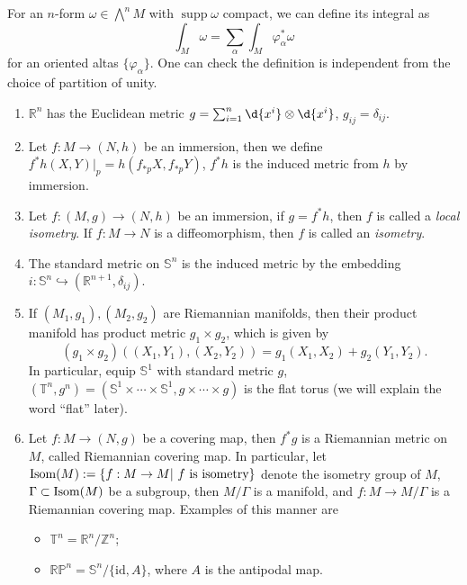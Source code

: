 \begin{rem}
    For an $n$-form $\omega\in\bigwedge^nM$ with $\operatorname{supp}\omega$ compact, we can define its integral as
    \[\int_M\omega=\sum_\alpha\int_M\varphi_\alpha^*\omega\]
    for an oriented altas $\{\varphi_\alpha\}$.
    One can check the definition is independent from the choice of partition of unity.
\end{rem}

\begin{eg}
    \begin{enumerate}[(1)]
        \item $\mathbb{R}^n$ has the Euclidean metric $g=\sum_{i=1}^n\d{x^i}\otimes\d{x^i}$, $g_{ij}=\delta_{ij}$.
        \item Let $f:M\to(N,h)$ be an immersion, then we define $f^*h(X,Y)|_p=h(f_{*p}X,f_{*p}Y)$, $f^*h$ is the induced metric from $h$ by immersion.
        \item Let $f:(M,g)\to(N,h)$ be an immersion, if $g=f^*h$, then $f$ is called a \emph{local isometry}.
        If $f:M\to N$ is a diffeomorphism, then $f$ is called an \emph{isometry}.
        \item The standard metric on $\mathbb{S}^n$ is the induced metric by the embedding $i:\mathbb{S}^n\hookrightarrow(\mathbb{R}^{n+1},\delta_{ij})$.
        \item If $(M_1,g_1),(M_2,g_2)$ are Riemannian manifolds, then their product manifold has product metric $g_1\times g_2$, which is given by
        \[(g_1\times g_2)((X_1,Y_1),(X_2,Y_2))=g_1(X_1,X_2)+g_2(Y_1,Y_2).\]
        In particular, equip $\mathbb{S}^1$ with standard metric $g$, $(\mathbb{T}^n,g^n)=(\mathbb{S}^1\times\cdots\times\mathbb{S}^1,g\times\cdots\times g)$ is the flat torus (we will explain the word ``flat'' later).
        \item Let $f:M\to(N,g)$ be a covering map, then $f^*g$ is a Riemannian metric on $M$, called Riemannian covering map.
        In particular, let $\operatorname{Isom}(M):=\{f:M\to M|\ f\ \text{is isometry}\}$ denote the isometry group of $M$, $\Gamma\subset\operatorname{Isom}(M)$ be a subgroup, then $M/\Gamma$ is a manifold, and $f:M\to M/\Gamma$ is a Riemannian covering map.
        Examples of this manner are
        \begin{itemize}
            \item $\mathbb{T}^n=\mathbb{R}^n/\mathbb{Z}^n$;
            \item $\mathbb{RP}^n=\mathbb{S}^n/\{\mathrm{id},A\}$, where $A$ is the antipodal map.
        \end{itemize}
    \end{enumerate}
\end{eg}

